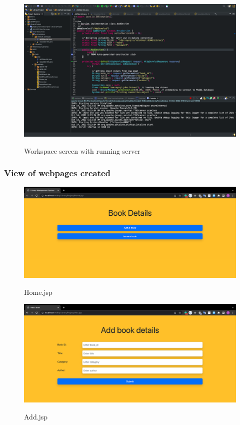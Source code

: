 \documentclass[12pt]{article}
\begin{document}
\begin{figure}[!hbt]
    \centering
    \includegraphics[scale=0.32]{screenshots/b3_02.png}
    \label{fig:my_label1}
    \caption{Workspace screen with running server}
\end{figure}

\newpage

\subsubsection{View of webpages created}

\begin{figure}[!hbt]
    \centering
    \includegraphics[scale=0.34]{screenshots/b3_ 03.png}
    \label{fig:my_label1}
    \caption{Home.jsp}
\end{figure}

\begin{figure}[!hbt]
    \centering
    \includegraphics[scale=0.34]{screenshots/b3_04.png}
    \label{fig:my_label1}
    \caption{Add.jsp}
\end{figure}
\end{document}
